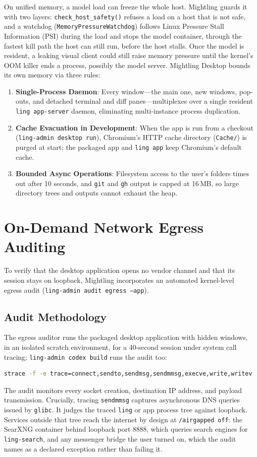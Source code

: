 \documentclass[11pt]{article}
\newcommand{\code}[1]{\texttt{#1}}
\newcommand{\agoff}{\code{/airgapped off}}
\begin{document}
On unified memory, a model load can freeze the whole host. Mightling guards it with two layers: \code{check\_host\_safety()}
refuses a load on a host that is not safe, and a watchdog (\code{MemoryPressureWatchdog}) follows Linux Pressure Stall
Information (PSI) during the load and stops the model container, through the fastest kill path the host can still run,
before the host stalls. Once the model is resident, a leaking visual client could still raise memory pressure until the
kernel's OOM killer ends a process, possibly the model server. Mightling Desktop bounds its own memory via three rules:
\begin{enumerate}
    \item \textbf{Single-Process Daemon}: Every window—the main one, new windows, pop-outs, and detached terminal and
    diff panes—multiplexes over a single resident \code{ling app-server} daemon, eliminating multi-instance process
    duplication.
    \item \textbf{Cache Evacuation in Development}: When the app is run from a checkout (\code{ling-admin desktop run}),
    Chromium's HTTP cache directory (\code{Cache/}) is purged at start; the packaged app and \code{ling app} keep
    Chromium's default cache.
    \item \textbf{Bounded Async Operations}: Filesystem access to the user's folders times out after 10 seconds, and
    \code{git} and \code{gh} output is capped at 16\,MB, so large directory trees and outputs cannot exhaust the heap.
\end{enumerate}

\section{On-Demand Network Egress Auditing}
\label{sec:egress-audit}

To verify that the desktop application opens no vendor channel and that its session stays on loopback, Mightling
incorporates an automated kernel-level egress audit (\code{ling-admin audit egress --app}).

\subsection{Audit Methodology}

The egress auditor runs the packaged desktop application with hidden windows, in an isolated scratch environment, for a
40-second session under system call tracing; \code{ling-admin codex build} runs the audit too:
\begin{lstlisting}[language=bash]
strace -f -e trace=connect,sendto,sendmsg,sendmmsg,execve,write,writev
\end{lstlisting}
The audit monitors every socket creation, destination IP address, and payload transmission. Crucially, tracing
\code{sendmmsg} captures asynchronous DNS queries issued by \code{glibc}. It judges the traced \code{ling} or app
process tree against loopback. Services outside that tree reach the internet by design at \agoff: the SearXNG
container behind loopback port 8888, which queries search engines for \code{ling-search}, and any messenger bridge
the user turned on, which the audit names as a declared exception rather than failing it.
\end{document}

